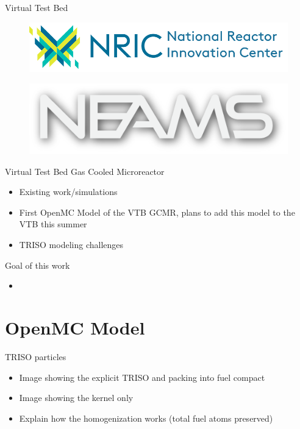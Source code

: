 \documentclass[9pt,t,aspectratio=169]{beamer}
\begin{document}
\begin{frame}{Virtual Test Bed \cite{vtb2023}}
    \begin{figure}
        \centering
        \includegraphics[width=0.6\linewidth]{figures/nric_logo.png}
    \end{figure}
    \begin{figure}
        \centering
        \includegraphics[width=0.6\linewidth]{figures/NEAMS.png}
    \end{figure}
\end{frame}
\hypersetup{citecolor=black}

\begin{frame}{Virtual Test Bed Gas Cooled Microreactor}
    \begin{itemize}
        \item Existing work/simulations
        \item First OpenMC Model of the VTB GCMR, plans to add this model to the VTB this summer
        \item TRISO modeling challenges
    \end{itemize}
\end{frame}

\begin{frame}{Goal of this work}
    \begin{itemize}
        \item
    \end{itemize}
\end{frame}

\section{OpenMC Model}

\begin{frame}{TRISO particles}
    \begin{itemize}
        \item Image showing the explicit TRISO and packing into fuel compact
        \item Image showing the kernel only
        \item Explain how the homogenization works (total fuel atoms preserved)
    \end{itemize}
\end{frame}
\end{document}
